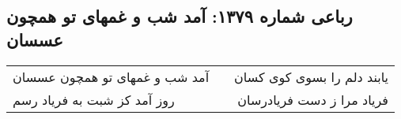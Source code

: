 \begin{center}
\section*{رباعی شماره ۱۳۷۹: آمد شب و غمهای تو همچون عسسان}
\label{sec:1379}
\begin{longtable}{l p{0.5cm} r}
آمد شب و غمهای تو همچون عسسان
&&
یابند دلم را بسوی کوی کسان
\\
روز آمد کز شبت به فریاد رسم
&&
فریاد مرا ز دست فریادرسان
\\
\end{longtable}
\end{center}
